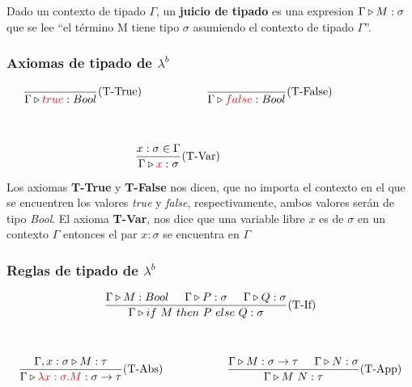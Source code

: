 Dado un contexto de tipado $\Gamma$, un \textbf{juicio de tipado} es una expresion $\Gamma\triangleright M : \sigma$ que se lee ``el término M tiene tipo $\sigma$ asumiendo el contexto de tipado $\Gamma$''. 

\subsubsection{Axiomas de tipado de \texorpdfstring{$\lambda^b$}{lambda b}}

\begin{equation*}
\begin{gathered}
    \frac{}{\judgeType{\Gamma}{\lambdaValue{true}}{Bool}}(\text{T-True}) \hspace*{2cm} \frac{}{\judgeType{\Gamma}{\lambdaValue{false}}{Bool}}(\text{T-False})\hspace*{2cm} \\
    \vspace*{5mm} \\
    \frac{x:\sigma\in\Gamma}{\judgeType{\Gamma}{\lambdaValue{x}}{\sigma}}(\text{T-Var})\hspace*{2cm}
\end{gathered}
\end{equation*}

\vspace*{5mm}
Los axiomas \textbf{T-True} y \textbf{T-False} nos dicen, que no importa el contexto en el que se encuentren los valores \textit{true} y \textit{false}, respectivamente, ambos valores serán de tipo \textit{Bool}. El axioma \textbf{T-Var}, nos dice que una variable libre $x$ es de $\sigma$ en un contexto $\Gamma$ entonces el par $x:\sigma$ se encuentra en $\Gamma$

\subsubsection{Reglas de tipado de \texorpdfstring{$\lambda^b$}{lambda b}}
\begin{equation*}
\begin{gathered}
\frac{\judgeType{\Gamma}{M}{Bool}\hspace*{5mm}\judgeType{\Gamma}{P}{\sigma}\hspace*{5mm}\judgeType{\Gamma}{Q}{\sigma}}{\judgeType{\Gamma}{\lambdaIf{M}{P}{Q}}{\sigma}}(\text{T-If}) \\
\vspace*{5mm} \\
\frac {\judgeType{\Gamma,x:\sigma}{M}{\tau}}
      {\judgeType{\Gamma}{\lambdaValue{\lambdaAbs{x}{\sigma}{M}}}{\sigma\to\tau}}(\text{T-Abs})\hspace*{2cm}
\frac{\judgeType{\Gamma}{M}{\sigma\to\tau}\hspace*{5mm}\judgeType{\Gamma}{N}{\sigma}}{\judgeType{\Gamma}{\lambdaApp{M}{N}}{\tau}}(\text{T-App})
\end{gathered}
\end{equation*}

